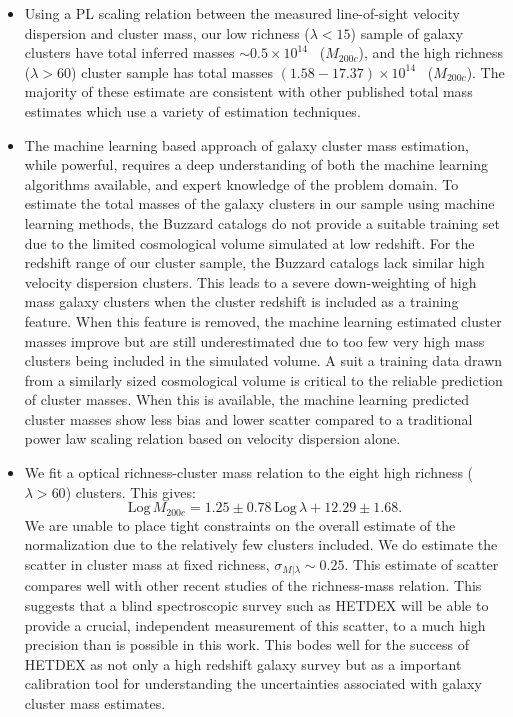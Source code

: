 \begin{itemize}
	\item Using a PL scaling relation between the measured line-of-sight velocity dispersion and cluster mass, our low richness ($\lambda < 15$) sample of galaxy clusters have total inferred masses $\sim 0.5 \times 10^{14}$ \Msol\ ($M_{200c}$), and the high richness ($\lambda > 60$) cluster sample has total masses $(1.58-17.37) \times 10^{14}$ \Msol\ ($M_{200c}$). The majority of these estimate are consistent with other published total mass estimates which use a variety of estimation techniques. 
	
	\item The machine learning based approach of galaxy cluster mass estimation, while powerful, requires a deep understanding of both the machine learning algorithms available, and expert knowledge of the problem domain. To estimate the total masses of the galaxy clusters in our sample using machine learning methods, the Buzzard catalogs do not provide a suitable training set due to the limited cosmological volume simulated at low redshift. For the redshift range of our cluster sample, the Buzzard catalogs lack similar high velocity dispersion clusters. This leads to a severe down-weighting of high mass galaxy clusters when the cluster redshift is included as a training feature. When this feature is removed, the machine learning estimated cluster masses improve but are still underestimated due to too few very high mass clusters being included in the simulated volume. A suit a training data drawn from a similarly sized cosmological volume is critical to the reliable prediction of cluster masses. When this is available, the machine learning predicted cluster masses show less bias and lower scatter compared to a traditional power law scaling relation based on velocity dispersion alone.

	\item We fit a optical richness-cluster mass relation to the eight high richness ($\lambda > 60$) clusters. This gives:
		\begin{equation}
			\mathrm{Log}\,M_{200c}=1.25\pm{0.78}\, \mathrm{Log}\,\lambda + 12.29\pm{1.68}.  
		\end{equation}
We are unable to place tight constraints on the overall estimate of the normalization due to the relatively few clusters included. We do estimate the scatter in cluster mass at fixed richness, $\sigma_{M|\lambda} \sim 0.25$. This estimate of scatter compares well with other recent studies of the richness-mass relation. This suggests that a blind spectroscopic survey such as HETDEX will be able to provide a crucial, independent measurement of this scatter, to a much high precision than is possible in this work. This bodes well for the success of HETDEX as not only a high redshift galaxy survey but as a important calibration tool for understanding the uncertainties associated with galaxy cluster mass estimates. 
\end{itemize}
